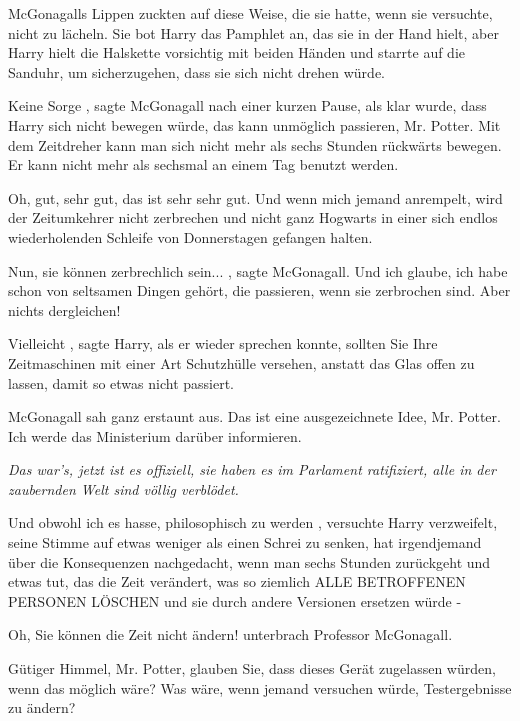 McGonagalls Lippen zuckten auf diese Weise, die sie hatte, wenn sie versuchte,
nicht zu lächeln. Sie bot Harry das Pamphlet an, das sie in der Hand hielt, aber
Harry hielt die Halskette vorsichtig mit beiden Händen und starrte auf die
Sanduhr, um sicherzugehen, dass sie sich nicht drehen würde.

\glqq Keine Sorge\grqq{} , sagte McGonagall nach einer kurzen Pause, als klar
wurde, dass Harry sich nicht bewegen würde, \glqq das kann unmöglich passieren,
Mr. Potter. Mit dem Zeitdreher kann man sich nicht mehr als sechs Stunden
rückwärts bewegen. Er kann nicht mehr als sechsmal an einem Tag benutzt
werden.\grqq{}

\glqq Oh, gut, sehr gut, das ist sehr sehr gut. Und wenn mich jemand anrempelt,
wird der Zeitumkehrer nicht zerbrechen und nicht ganz Hogwarts in einer sich
endlos wiederholenden Schleife von Donnerstagen gefangen halten.\grqq{}

\glqq Nun, sie können zerbrechlich sein...\grqq{} , sagte McGonagall. \glqq Und
ich glaube, ich habe schon von seltsamen Dingen gehört, die passieren, wenn sie
zerbrochen sind. Aber nichts dergleichen!\grqq{}

\glqq Vielleicht\grqq{} , sagte Harry, als er wieder sprechen konnte, \glqq
sollten Sie Ihre Zeitmaschinen mit einer Art Schutzhülle versehen, anstatt das
Glas offen zu lassen, damit so etwas nicht passiert.\grqq{}

McGonagall sah ganz erstaunt aus. \glqq Das ist eine ausgezeichnete Idee, Mr.
Potter. Ich werde das Ministerium darüber informieren.\grqq{}

\emph{ Das war's, jetzt ist es offiziell, sie haben es im Parlament ratifiziert,
alle in der zaubernden Welt sind völlig verblödet.}

\glqq Und obwohl ich es hasse, philosophisch zu werden\grqq{} , versuchte Harry
verzweifelt, seine Stimme auf etwas weniger als einen Schrei zu senken, \glqq
hat irgendjemand über die Konsequenzen nachgedacht, wenn man sechs Stunden
zurückgeht und etwas tut, das die Zeit verändert, was so ziemlich ALLE
BETROFFENEN PERSONEN LÖSCHEN und sie durch andere Versionen ersetzen würde
-\grqq{}

\glqq Oh, Sie können die Zeit nicht ändern!\grqq{} unterbrach Professor
McGonagall.

\glqq Gütiger Himmel, Mr. Potter, glauben Sie, dass dieses Gerät zugelassen
würden, wenn das möglich wäre? Was wäre, wenn jemand versuchen würde,
Testergebnisse zu ändern?\grqq{}

